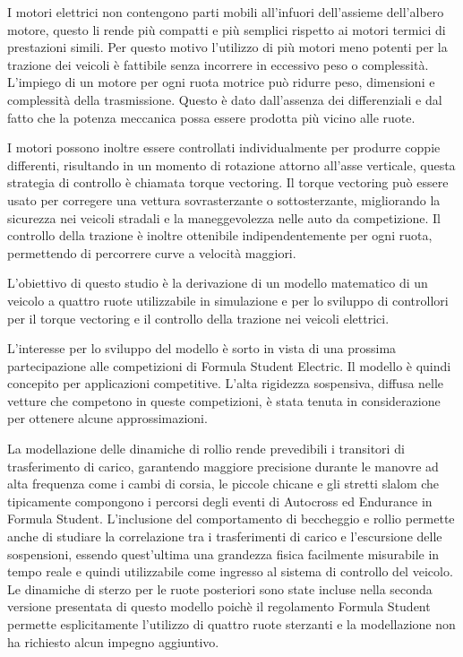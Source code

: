 \sommarioITA
I motori elettrici non contengono parti mobili all'infuori dell'assieme dell'albero motore, questo li rende più compatti e più semplici rispetto ai motori termici di prestazioni simili. Per questo motivo l'utilizzo di più motori meno potenti per la trazione dei veicoli è fattibile senza incorrere in eccessivo peso o complessità.
L'impiego di un motore per ogni ruota motrice può ridurre peso, dimensioni e complessità della trasmissione. Questo è dato dall'assenza dei differenziali e dal fatto che la potenza meccanica possa essere prodotta più vicino alle ruote.

I motori possono inoltre essere controllati individualmente per produrre coppie differenti, risultando in un momento di rotazione attorno all'asse verticale, questa strategia di controllo è chiamata torque vectoring.
Il torque vectoring può essere usato per corregere una vettura sovrasterzante o sottosterzante, migliorando la sicurezza nei veicoli stradali e la maneggevolezza nelle auto da competizione.
Il controllo della trazione è inoltre ottenibile indipendentemente per ogni ruota, permettendo di percorrere curve a velocità maggiori.

L'obiettivo di questo studio è la derivazione di un modello matematico di un veicolo a quattro ruote utilizzabile in simulazione e per lo sviluppo di controllori per il torque vectoring e il controllo della trazione nei veicoli elettrici.

L'interesse per lo sviluppo del modello è sorto in vista di una prossima partecipazione alle competizioni di Formula Student Electric. Il modello è quindi concepito per applicazioni competitive. L'alta rigidezza sospensiva, diffusa nelle vetture che competono in queste competizioni, è stata tenuta in considerazione per ottenere alcune approssimazioni.

La modellazione delle dinamiche di rollio rende prevedibili i transitori di trasferimento di carico, garantendo maggiore precisione durante le manovre ad alta frequenza come i cambi di corsia, le piccole chicane e gli stretti slalom che tipicamente compongono i percorsi degli eventi di Autocross ed Endurance in Formula Student.
L'inclusione del comportamento di beccheggio e rollio permette anche di studiare la correlazione tra i trasferimenti di carico e l'escursione delle sospensioni, essendo quest'ultima una grandezza fisica facilmente misurabile in tempo reale e quindi utilizzabile come ingresso al sistema di controllo del veicolo.
Le dinamiche di sterzo per le ruote posteriori sono state incluse nella seconda versione presentata di questo modello poichè il regolamento Formula Student permette esplicitamente l'utilizzo di quattro ruote sterzanti e la modellazione non ha richiesto alcun impegno aggiuntivo.

